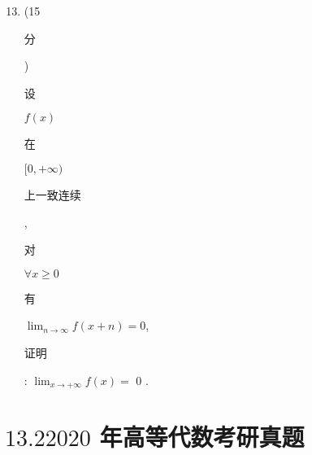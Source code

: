 \documentclass[10pt]{article}
\begin{document}
\begin{enumerate}
  \setcounter{enumi}{12}
  \item (15 \begin{CJK}{UTF8}{mj}分\end{CJK}) \begin{CJK}{UTF8}{mj}设\end{CJK} $f(x)$ \begin{CJK}{UTF8}{mj}在\end{CJK} $[0,+\infty)$ \begin{CJK}{UTF8}{mj}上一致连续\end{CJK}, \begin{CJK}{UTF8}{mj}对\end{CJK} $\forall x \geq 0$ \begin{CJK}{UTF8}{mj}有\end{CJK} $\lim _{n \rightarrow \infty} f(x+n)=0$, \begin{CJK}{UTF8}{mj}证明\end{CJK}: $\lim _{x \rightarrow+\infty} f(x)=$ 0 .
\end{enumerate}
\section{$13.22020$ 年高等代数考研真题}
\end{document}
